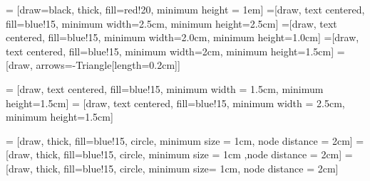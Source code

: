 

 = [draw=black, thick, fill=red!20, minimum height = 1em]
 =[draw, text centered, fill=blue!15, minimum width=2.5cm, minimum height=2.5cm]
 =[draw, text centered, fill=blue!15, minimum width=2.0cm, minimum height=1.0cm]
 =[draw, text centered, fill=blue!15, minimum width=2cm, minimum height=1.5cm]
 = [draw, arrows={-Triangle[length=0.2cm]}]

 = [draw, text centered, fill=blue!15, minimum width = 1.5cm,
minimum height=1.5cm]
 = [draw, text centered, fill=blue!15, minimum width = 2.5cm,
minimum height=1.5cm]

 = [draw, thick, fill=blue!15, circle, minimum size = 1cm, node distance = 2cm]
 = [draw, thick, fill=blue!15, circle, minimum size = 1cm ,node distance = 2cm]
 = [draw, thick, fill=blue!15, circle, minimum size= 1cm, node distance = 2cm]

